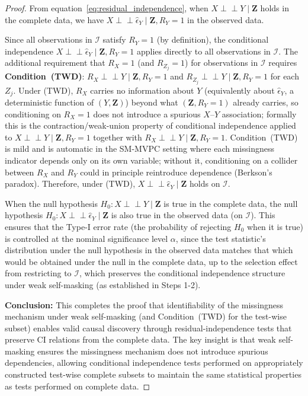 \documentclass[runningheads]{llncs}
\begin{document}
\begin{proof}
From equation~\eqref{eq:residual_independence}, when $X \perp\!\!\!\perp Y \mid \mathbf{Z}$ holds in the complete data, we have $X \perp\!\!\!\perp \hat{\epsilon}_Y \mid \mathbf{Z}, R_Y = 1$ in the observed data. 

Since all observations in $\mathcal{I}$ satisfy $R_Y = 1$ (by definition), the conditional independence $X \perp\!\!\!\perp \hat{\epsilon}_Y \mid \mathbf{Z}, R_Y = 1$ applies directly to all observations in $\mathcal{I}$. The additional requirement that $R_X = 1$ (and $R_{Z_j}=1$) for observations in $\mathcal{I}$ requires \textbf{Condition~(TWD)}: $R_X \perp\!\!\!\perp Y \mid \mathbf{Z}, R_Y{=}1$ and $R_{Z_j} \perp\!\!\!\perp Y \mid \mathbf{Z}, R_Y{=}1$ for each $Z_j$. Under (TWD), $R_X$ carries no information about $Y$ (equivalently about $\hat{\epsilon}_Y$, a deterministic function of $(Y,\mathbf{Z})$) beyond what $(\mathbf{Z},R_Y{=}1)$ already carries, so conditioning on $R_X{=}1$ does not introduce a spurious $X$--$Y$ association; formally this is the contraction/weak-union property of conditional independence applied to $X \perp\!\!\!\perp Y \mid \mathbf{Z}, R_Y{=}1$ together with $R_X \perp\!\!\!\perp Y \mid \mathbf{Z}, R_Y{=}1$. Condition~(TWD) is mild and is automatic in the SM-MVPC setting where each missingness indicator depends only on its own variable; without it, conditioning on a collider between $R_X$ and $R_Y$ could in principle reintroduce dependence (Berkson's paradox). Therefore, under (TWD), $X \perp\!\!\!\perp \hat{\epsilon}_Y \mid \mathbf{Z}$ holds on $\mathcal{I}$.

When the null hypothesis $H_0: X \perp\!\!\!\perp Y \mid \mathbf{Z}$ is true in the complete data, the null hypothesis $H_0: X \perp\!\!\!\perp \hat{\epsilon}_Y \mid \mathbf{Z}$ is also true in the observed data (on $\mathcal{I}$). This ensures that the Type-I error rate (the probability of rejecting $H_0$ when it is true) is controlled at the nominal significance level $\alpha$, since the test statistic's distribution under the null hypothesis in the observed data matches that which would be obtained under the null in the complete data, up to the selection effect from restricting to $\mathcal{I}$, which preserves the conditional independence structure under weak self-masking (as established in Steps 1-2).

\textbf{Conclusion:}
This completes the proof that identifiability of the missingness mechanism under weak self-masking (and Condition~(TWD) for the test-wise subset) enables valid causal discovery through residual-independence tests that preserve CI relations from the complete data. The key insight is that weak self-masking ensures the missingness mechanism does not introduce spurious dependencies, allowing conditional independence tests performed on appropriately constructed test-wise complete subsets to maintain the same statistical properties as tests performed on complete data.
\end{proof}
\end{document}
